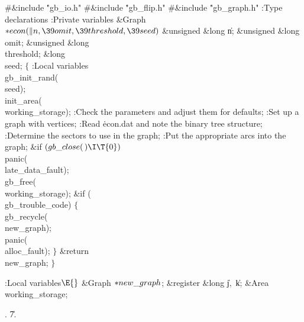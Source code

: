 \Y\B\8\#\&{include} \.{"gb\_io.h"}\6
\8\#\&{include} \.{"gb\_flip.h"}\6
\8\#\&{include} \.{"gb\_graph.h"}\6
\ATH\7
:Type declarations\X\6
:Private variables\X\7
\1\1\&{Graph} ${}{*}\\{econ}(\|n,\39\\{omit},\39\\{threshold},\39\\{seed}){}$\6
\&{unsigned} \&{long} \|n;\6
\&{unsigned} \&{long} \\{omit};\6
\&{unsigned} \&{long} \\{threshold};\6
\&{long} \\{seed};\2\2\6
${}\{{}$\5
\1:Local variables\X\7
\\{gb\_init\_rand}(\\{seed});\6
\\{init\_area}(\\{working\_storage});\6
:Check the parameters and adjust them for defaults\X;\6
:Set up a graph with  vertices\X;\6
:Read \.{econ.dat} and note the binary tree structure\X;\6
:Determine the  sectors to use in the graph\X;\6
:Put the appropriate arcs into the graph\X;\6
\&{if} ${}(\\{gb\_close}(\,)\I\T{0}){}$\1\5
\\{panic}(\\{late\_data\_fault});\2\6
\\{gb\_free}(\\{working\_storage});\6
\&{if} (\\{gb\_trouble\_code})\5
${}\{{}$\1\6
\\{gb\_recycle}(\\{new\_graph});\6
\\{panic}(\\{alloc\_fault});\6
\4${}\}{}$\2\6
\&{return} \\{new\_graph};\6
\4${}\}{}$\2\par
\fi

\B{}:Local variables\X${}\E{}$\6
\&{Graph} ${}{*}\\{new\_graph}{}$;\6
\&{register} \&{long} \|j${},{}$ \|k;\6
\&{Area} \\{working\_storage};\par
{}.
\U7.\fi

